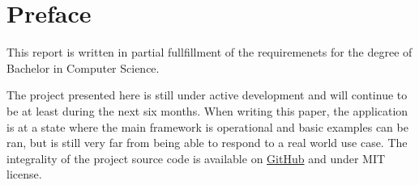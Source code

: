 \chapter{Preface}
This report is written in partial fullfillment of the requiremenets 
for the degree of Bachelor in Computer Science. 

The project presented here is still under active development and 
will continue to be at least during the next six months. When writing 
this paper, the application is at a state where the main framework 
is operational and basic examples can be ran, but is still very far 
from being able to respond to a real world use case. The integrality 
of the project source code is available on 
\href{https://github.com/tuvistavie/scala-x-server}{GitHub} 
and under MIT license.

